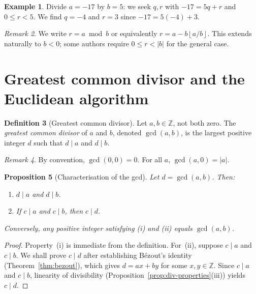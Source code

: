\documentclass[12pt,a4paper,openany]{book}
\theoremstyle{definition}
\newtheorem{definition}{Definition}[chapter]
\newtheorem{example}[definition]{Example}
\theoremstyle{plain}
\newtheorem{proposition}[definition]{Proposition}
\theoremstyle{remark}
\newtheorem{remark}[definition]{Remark}
\newcommand{\Z}{\mathbb{Z}}
\newcommand{\abs}[1]{\left|#1\right|}
\newcommand{\floor}[1]{\left\lfloor #1 \right\rfloor}
\begin{document}
\begin{example}
\label{ex:division-algorithm}
Divide $a = -17$ by $b = 5$: we seek $q,r$ with $-17 = 5q + r$ and
$0 \le r < 5$. We find $q = -4$ and $r = 3$ since $-17 = 5(-4) + 3$.
\end{example}

\begin{remark}
\label{rem:division-alg-notation}
We write $r = a \bmod b$ or equivalently
$r = a - b\floor{a/b}$. This extends naturally to $b < 0$; some authors
require $0 \le r < \abs{b}$ for the general case.
\end{remark}

\section{Greatest common divisor and the Euclidean algorithm}
\label{sec:gcd}

\begin{definition}[Greatest common divisor]
\label{def:gcd}
Let $a,b \in \Z$, not both zero. The \emph{greatest common divisor} of $a$
and $b$, denoted $\gcd(a,b)$, is the largest positive integer $d$ such that
$d \mid a$ and $d \mid b$.
\end{definition}

\begin{remark}
\label{rem:gcd-convention}
By convention, $\gcd(0,0) = 0$. For all $a$, $\gcd(a,0) = \abs{a}$.
\end{remark}

\begin{proposition}[Characterisation of the gcd]
\label{prop:gcd-char}
Let $d = \gcd(a,b)$. Then:
\begin{enumerate}[label=(\roman*)]
  \item $d \mid a$ and $d \mid b$.
  \item If $c \mid a$ and $c \mid b$, then $c \mid d$.
\end{enumerate}
Conversely, any positive integer satisfying (i) and (ii) equals $\gcd(a,b)$.
\end{proposition}

\begin{proof}
Property~(i) is immediate from the definition. For~(ii), suppose $c \mid a$
and $c \mid b$. We shall prove $c \mid d$ after establishing B\'{e}zout's
identity (Theorem~\ref{thm:bezout}), which gives $d = ax + by$ for some
$x, y \in \Z$. Since $c \mid a$ and $c \mid b$, linearity of divisibility
(Proposition~\ref{prop:div-properties}(iii)) yields $c \mid d$.
\end{proof}
\end{document}
